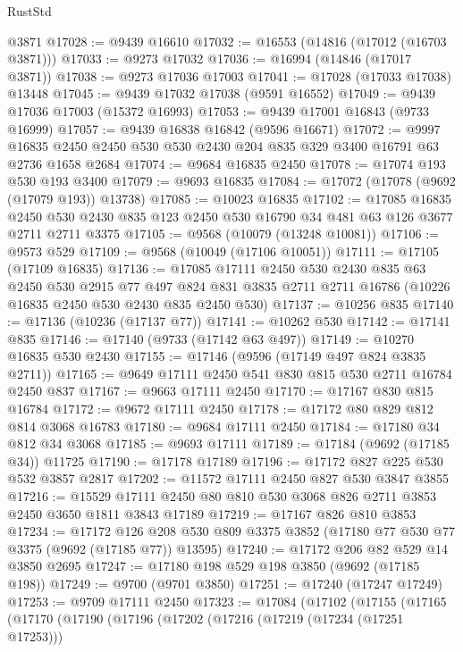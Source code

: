 \begin{lexlean}{RustStd}
\begin{coremodule}
{\begin{coremodule}
{{{{{{{{{{{{{{{{{{{{{{{{{{{{{{{{{{{{{{{{{{{{{{{{{{{{{{{    @3871
@17028 := @9439 @16610
@17032 := @16553 (@14816 (@17012 (@16703 @3871)))
@17033 := @9273 @17032
@17036 := @16994 (@14846 (@17017 @3871))
@17038 := @9273 @17036 @17003
@17041 := @17028 (@17033 @17038) @13448
@17045 := @9439 @17032 @17038 (@9591 @16552)
@17049 := @9439 @17036 @17003 (@15372 @16993)
@17053 := @9439 @17001 @16843 (@9733 @16999)
@17057 := @9439 @16838 @16842 (@9596 @16671)
@17072 := @9997 @16835 @2450 @2450 @530 @530 @2430 @204 @835 @329 @3400 @16791 @63 @2736 @1658 @2684
@17074 := @9684 @16835 @2450
@17078 := @17074 @193 @530 @193 @3400
@17079 := @9693 @16835
@17084 := @17072 (@17078 (@9692 (@17079 @193)) @13738)
@17085 := @10023 @16835
@17102 := @17085
    @16835
    @2450
    @530
    @2430
    @835
    @123
    @2450
    @530
    @16790
    @34
    @481
    @63
    @126
    @3677
    @2711
    @2711
    @3375
@17105 := @9568 (@10079 (@13248 @10081))
@17106 := @9573 @529
@17109 := @9568 (@10049 (@17106 @10051))
@17111 := @17105 (@17109 @16835)
@17136 := @17085
    @17111
    @2450
    @530
    @2430
    @835
    @63
    @2450
    @530
    @2915
    @77
    @497
    @824
    @831
    @3835
    @2711
    @2711
    @16786
    (@10226 @16835 @2450 @530 @2430 @835 @2450 @530)
@17137 := @10256 @835
@17140 := @17136 (@10236 (@17137 @77))
@17141 := @10262 @530
@17142 := @17141 @835
@17146 := @17140 (@9733 (@17142 @63 @497))
@17149 := @10270 @16835 @530 @2430
@17155 := @17146 (@9596 (@17149 @497 @824 @3835 @2711))
@17165 := @9649 @17111 @2450 @541 @830 @815 @530 @2711 @16784 @2450 @837
@17167 := @9663 @17111 @2450
@17170 := @17167 @830 @815 @16784
@17172 := @9672 @17111 @2450
@17178 := @17172 @80 @829 @812 @814 @3068 @16783
@17180 := @9684 @17111 @2450
@17184 := @17180 @34 @812 @34 @3068
@17185 := @9693 @17111
@17189 := @17184 (@9692 (@17185 @34)) @11725
@17190 := @17178 @17189
@17196 := @17172 @827 @225 @530 @532 @3857 @2817
@17202 := @11572 @17111 @2450 @827 @530 @3847 @3855
@17216 := @15529 @17111 @2450 @80 @810 @530 @3068 @826 @2711 @3853 @2450 @3650 @1811 @3843 @17189
@17219 := @17167 @826 @810 @3853
@17234 := @17172
    @126
    @208
    @530
    @809
    @3375
    @3852
    (@17180 @77 @530 @77 @3375 (@9692 (@17185 @77)) @13595)
@17240 := @17172 @206 @82 @529 @14 @3850 @2695
@17247 := @17180 @198 @529 @198 @3850 (@9692 (@17185 @198))
@17249 := @9700 (@9701 @3850)
@17251 := @17240 (@17247 @17249)
@17253 := @9709 @17111 @2450
@17323 := @17084
    (@17102
      (@17155
        (@17165
          (@17170
            (@17190
              (@17196
                (@17202
                  (@17216
                    (@17219 (@17234 (@17251 @17253)))
}}}}}}}}}}}}}}}}}}}}}}}}}}}}}}}}}}}}}}}}}}}}}}}}}}}}}}}
\end{coremodule}}
\end{coremodule}
\end{lexlean}
